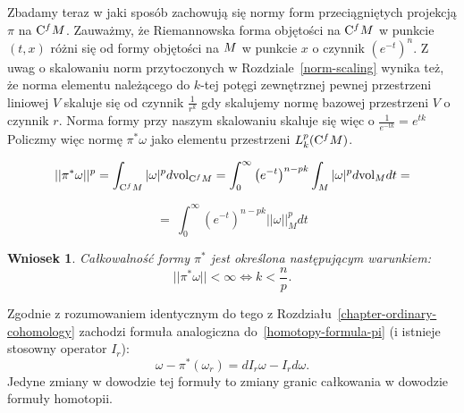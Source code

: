 \documentclass[licencjacka]{pracamgr}
\theoremstyle{definition}
\theoremstyle{definition}
\theoremstyle{plain}
\theoremstyle{plain}
\theoremstyle{plain}
\theoremstyle{plain}
\theoremstyle{plain}
\newtheorem{wniosek}{Wniosek}[section]
\def\cfm{\ensuremath\mathrm{C}^fM}
\def\M{\ensuremath M}
\newcommand\deff{\mathrel{\overset{\makebox[0pt]{\mbox{\normalfont\tiny\sffamily def}}}{:=}}}
\begin{document}

Zbadamy teraz w jaki sposób zachowują się normy form przeciągniętych projekcją
$\pi$ na $\cfm$.  Zauważmy, że Riemannowska forma objętości na $\cfm$ w punkcie
$(t,x)$ różni się od formy objętości na $\M$ w punkcie $x$ o czynnik
$(e^{-t})^n$.  Z uwag o skalowaniu norm przytoczonych w
Rozdziale~\ref{norm-scaling} wynika też, że norma elementu należącego do
$k$-tej potęgi zewnętrznej pewnej przestrzeni liniowej $V$ skaluje się od
czynnik $\frac{1}{r^k}$ gdy skalujemy normę bazowej przestrzeni $V$ o czynnik
$r$.  Norma formy przy naszym skalowaniu skaluje się więc o $\frac{1}{e^{-tk}}
= e^{tk}$ Policzmy więc normę $\pi^\ast \omega$ jako elementu przestrzeni
$L_k^p (\cfm)$.

\[
    ||\pi^\ast \omega ||^p = \int_{\cfm} |\omega |^p d \mathrm{vol}_{\cfm} =
    \int_0^\infty \left( e^{-t} \right)^{n-pk} \int_M |\omega|^p d
    \mathrm{vol}_M dt = 
\]

\[
    = \
    \int_0^\infty \left( e^{-t} \right)^{n-pk} || \omega ||^p_{M} dt 
\]


\begin{wniosek}\label{pi-integrable}
  Całkowalność formy $\pi^\ast$ jest określona następującym warunkiem:
  \[
  ||\pi^\ast \omega ||  < \infty  \iff  k < \frac{n}{p}.
  \]
\end{wniosek}


Zgodnie z rozumowaniem identycznym do tego  z
Rozdziału~\ref{chapter-ordinary-cohomology} zachodzi formuła analogiczna
do~\ref{homotopy-formula-pi} (i istnieje stosowny operator $I_r$):
\[
    \omega - \pi^\ast(\omega_r) = dI_r \omega - I_r d\omega.
\]
Jedyne zmiany w dowodzie tej formuły to zmiany granic całkowania w dowodzie
formuły homotopii. \\
\end{document}
